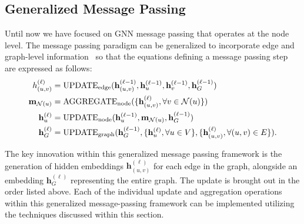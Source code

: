 \subsection{Generalized Message Passing}
Until now we have focused on GNN message passing that operates at the node level. The message passing paradigm can be generalized to incorporate edge and graph-level information~\cite{battaglia2018relationalInductiveBiases} so that the equations defining a message passing step are expressed as follows:
\begin{align*}
\label\mathbf{h}^{(\ell)}_{(u,v)} &= \text{UPDATE}_\text{edge}(\mathbf{h}^{(\ell-1)}_{(u,v)}, \mathbf{h}^{(\ell-1)}_u, \mathbf{h}^{(\ell-1)}_v, \mathbf{h}^{(\ell-1)}_G)\\
\mathbf{m}_{\mathcal{N}(u)} &= \text{AGGREGATE}_\text{node}(\{\mathbf{h}^{(\ell)}_{(u,v)}, \forall v \in \mathcal{N}(u)\})\\
\mathbf{h}^{(\ell)}_u &= \text{UPDATE}_\text{node}(\mathbf{h}^{(\ell-1)}_u, \mathbf{m}_{\mathcal{N}(u)}, \mathbf{h}^{(\ell-1)}_G)\\
\mathbf{h}^{(\ell)}_G &= \text{UPDATE}_\text{graph}(\mathbf{h}^{(\ell-1)}_G, \{\mathbf{h}^{(\ell)}_u, \forall u \in V\}, \{\mathbf{h}^{(\ell)}_{(u,v)}, \forall (u,v) \in E\}).
\end{align*}

The key innovation within this generalized message passing framework is the generation of hidden embeddings $ \mathbf{h}^{(\ell)}_{(u,v)} $ for each edge in the graph, alongside an embedding $ \mathbf{h}^{(\ell)}_G $ representing the entire graph. 
The update is brought out in the order listed above. Each of the individual update and aggregation operations within this generalized message-passing framework can be implemented utilizing the techniques discussed within this section.